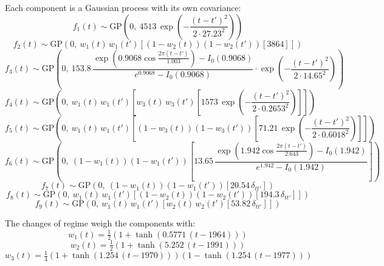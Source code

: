 \documentclass[11pt,a4paper]{article}
\begin{document}
Each component is a Gaussian process with its own covariance:
\begin{dmath*}
f_{1}(t) \sim \mathrm{GP}\!\left(0,\ 4513\,\exp\!\left(-\frac{(t - t')^2}{2 \cdot 27.23^2}\right)\right)
\end{dmath*}
\begin{dmath*}
f_{2}(t) \sim \mathrm{GP}\!\left(0,\ w_{1}(t)\,w_{1}(t')\left[(1 - w_{2}(t))(1 - w_{2}(t'))\left[3864\right]\right]\right)
\end{dmath*}
\begin{dmath*}
f_{3}(t) \sim \mathrm{GP}\!\left(0,\ 153.8\,\frac{\exp\!\left(0.9068\cos\frac{2\pi (t - t')}{1.003}\right) - I_0(0.9068)}{e^{0.9068} - I_0(0.9068)} \cdot \exp\!\left(-\frac{(t - t')^2}{2 \cdot 14.65^2}\right)\right)
\end{dmath*}
\begin{dmath*}
f_{4}(t) \sim \mathrm{GP}\!\left(0,\ w_{1}(t)\,w_{1}(t')\left[w_{3}(t)\,w_{3}(t')\left[1573\,\exp\!\left(-\frac{(t - t')^2}{2 \cdot 0.2653^2}\right)\right]\right]\right)
\end{dmath*}
\begin{dmath*}
f_{5}(t) \sim \mathrm{GP}\!\left(0,\ w_{1}(t)\,w_{1}(t')\left[(1 - w_{3}(t))(1 - w_{3}(t'))\left[71.21\,\exp\!\left(-\frac{(t - t')^2}{2 \cdot 0.6018^2}\right)\right]\right]\right)
\end{dmath*}
\begin{dmath*}
f_{6}(t) \sim \mathrm{GP}\!\left(0,\ (1 - w_{1}(t))(1 - w_{1}(t'))\left[13.65\,\frac{\exp\!\left(1.942\cos\frac{2\pi (t - t')}{2.643}\right) - I_0(1.942)}{e^{1.942} - I_0(1.942)}\right]\right)
\end{dmath*}
\begin{dmath*}
f_{7}(t) \sim \mathrm{GP}\!\left(0,\ (1 - w_{1}(t))(1 - w_{1}(t'))\left[20.54\,\delta_{t t'}\right]\right)
\end{dmath*}
\begin{dmath*}
f_{8}(t) \sim \mathrm{GP}\!\left(0,\ w_{1}(t)\,w_{1}(t')\left[(1 - w_{2}(t))(1 - w_{2}(t'))\left[194.3\,\delta_{t t'}\right]\right]\right)
\end{dmath*}
\begin{dmath*}
f_{9}(t) \sim \mathrm{GP}\!\left(0,\ w_{1}(t)\,w_{1}(t')\left[w_{2}(t)\,w_{2}(t')\left[53.82\,\delta_{t t'}\right]\right]\right)
\end{dmath*}

The changes of regime weigh the components with:
\begin{dmath*}
w_{1}(t) = \tfrac{1}{2}\left(1 + \tanh\left(0.5771\,(t - 1964)\right)\right)
\end{dmath*}
\begin{dmath*}
w_{2}(t) = \tfrac{1}{2}\left(1 + \tanh\left(5.252\,(t - 1991)\right)\right)
\end{dmath*}
\begin{dmath*}
w_{3}(t) = \tfrac{1}{4}\left(1 + \tanh\left(1.254\,(t - 1970)\right)\right)\left(1 - \tanh\left(1.254\,(t - 1977)\right)\right)
\end{dmath*}
\end{document}
